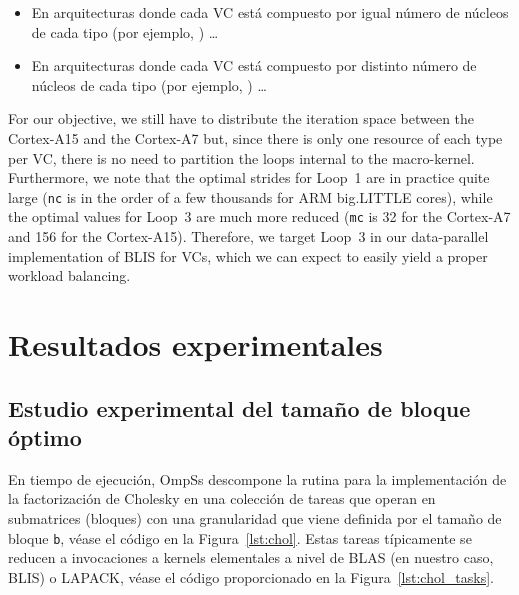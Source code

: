 \begin{itemize}
	\item En arquitecturas donde cada VC está compuesto por igual número de núcleos de cada tipo (por ejemplo, \odroid) \ldots

	\item En arquitecturas donde cada VC está compuesto por distinto número de núcleos de cada tipo (por ejemplo, \juno) \ldots

\end{itemize}

For our objective, we still have to distribute the iteration space between the Cortex-A15 and the Cortex-A7 but, since there is only one resource of each type per VC,
there is no need to partition the loops internal to the macro-kernel. 
Furthermore, we note that the optimal strides for Loop~1 are in practice quite
large ({\tt nc} is in the order of a few thousands for ARM big.LITTLE cores), while the optimal values for Loop~3 are much more reduced
({\tt mc} is 32 for the Cortex-A7 and 156 for the Cortex-A15). Therefore, we target Loop~3 in our data-parallel implementation of BLIS for
VCs, which we can expect to easily yield a proper workload balancing.


\section{Resultados experimentales}

\subsection{Estudio experimental del tamaño de bloque óptimo}

En tiempo de ejecución, OmpSs descompone la rutina para la implementación de la factorización de Cholesky en una colección de tareas
que operan en submatrices (bloques) con una granularidad que viene definida por el tamaño de bloque {\tt b}, véase el código en la 
Figura~\ref{lst:chol}. Estas tareas típicamente se reducen a invocaciones a kernels elementales a nivel de BLAS (en nuestro caso,
BLIS) o LAPACK, véase el código proporcionado en la Figura~\ref{lst:chol_tasks}.  

\newcommand{\bopt}{b^{\mbox{\rm \scriptsize opt}}\xspace}

